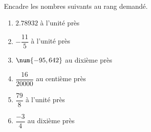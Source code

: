 %
%
  Encadre les nombres suivants au rang demandé.
  \begin{enumerate}[cols=2]
    \item $\num{2,78932}$ à l'unité près
    \item $- \dfrac{11}{5}$ à l'unité près
    \item $\num{- 95,642}$ au dixième près
    \item $\dfrac{16}{\num{20000}}$ au centième près
    \item $\dfrac{79}{8}$ à l'unité près
    \item $\dfrac{-3}{4}$ au dixième près
  \end{enumerate}
